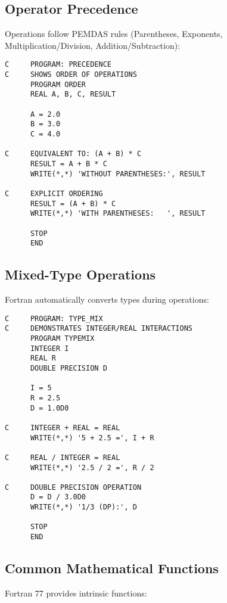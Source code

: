 \documentclass{book}
\begin{document}
\subsection*{Operator Precedence}
Operations follow PEMDAS rules (Parentheses, Exponents, Multiplication/Division, Addition/Subtraction):

\begin{verbatim}
C     PROGRAM: PRECEDENCE
C     SHOWS ORDER OF OPERATIONS
      PROGRAM ORDER
      REAL A, B, C, RESULT
      
      A = 2.0
      B = 3.0
      C = 4.0
      
C     EQUIVALENT TO: (A + B) * C
      RESULT = A + B * C
      WRITE(*,*) 'WITHOUT PARENTHESES:', RESULT
      
C     EXPLICIT ORDERING
      RESULT = (A + B) * C
      WRITE(*,*) 'WITH PARENTHESES:   ', RESULT
      
      STOP
      END
\end{verbatim}

\subsection*{Mixed-Type Operations}
Fortran automatically converts types during operations:

\begin{verbatim}
C     PROGRAM: TYPE_MIX
C     DEMONSTRATES INTEGER/REAL INTERACTIONS
      PROGRAM TYPEMIX
      INTEGER I
      REAL R
      DOUBLE PRECISION D
      
      I = 5
      R = 2.5
      D = 1.0D0
      
C     INTEGER + REAL = REAL
      WRITE(*,*) '5 + 2.5 =', I + R
      
C     REAL / INTEGER = REAL
      WRITE(*,*) '2.5 / 2 =', R / 2
      
C     DOUBLE PRECISION OPERATION
      D = D / 3.0D0
      WRITE(*,*) '1/3 (DP):', D
      
      STOP
      END
\end{verbatim}

\subsection*{Common Mathematical Functions}
Fortran 77 provides intrinsic functions:
\end{document}
